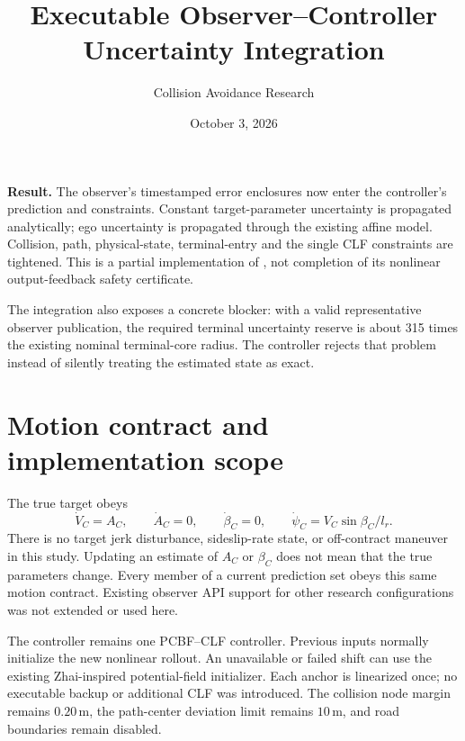 \documentclass[11pt]{article}
\title{Executable Observer--Controller Uncertainty Integration}
\author{Collision Avoidance Research}
\date{October 3, 2026}
\begin{document}
\maketitle

\textbf{Result.} The observer's timestamped error enclosures now enter the
controller's prediction and constraints. Constant target-parameter uncertainty
is propagated analytically; ego uncertainty is propagated through the existing
affine model. Collision, path, physical-state, terminal-entry and the single
CLF constraints are tightened. This is a partial implementation of
, not completion of its
nonlinear output-feedback safety certificate.

The integration also exposes a concrete blocker: with a valid representative
observer publication, the required terminal uncertainty reserve is about
315 times the existing nominal terminal-core radius. The controller rejects
that problem instead of silently treating the estimated state as exact.

\section{Motion contract and implementation scope}
The true target obeys
\[
 \dot V_C=A_C,\qquad \dot A_C=0,\qquad \dot\beta_C=0,\qquad
 \dot\psi_C=V_C\sin\beta_C/l_r.
\]
There is no target jerk disturbance, sideslip-rate state, or off-contract
maneuver in this study. Updating an estimate of $A_C$ or $\beta_C$ does not
mean that the true parameters change. Every member of a current prediction
set obeys this same motion contract. Existing observer API support for other
research configurations was not extended or used here.

The controller remains one PCBF--CLF controller. Previous inputs normally
initialize the new nonlinear rollout. An unavailable or failed shift can use
the existing Zhai-inspired potential-field initializer. Each anchor is
linearized once; no executable backup or additional CLF was introduced.
The collision node margin remains $0.20\,\mathrm m$, the path-center deviation
limit remains $10\,\mathrm m$, and road boundaries remain disabled.
\end{document}
